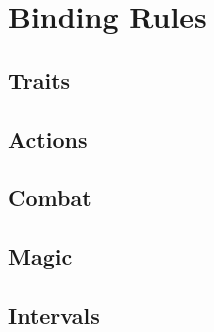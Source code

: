 \documentclass[a4paper,openany]{book}
\date{\today}
\begin{document}
\frontmatter

\small
\section*{Binding Rules}

\physicalSkillChart

\mentalSkillChart

\begin{multicols}{2}

\subsection*{Traits}











\subsection*{Actions}






\subsection*{Combat}





\commonWeaponsChart



\commonArmourChart



\subsection*{Magic}



\subsection*{Intervals}



\end{multicols}
\end{document}

